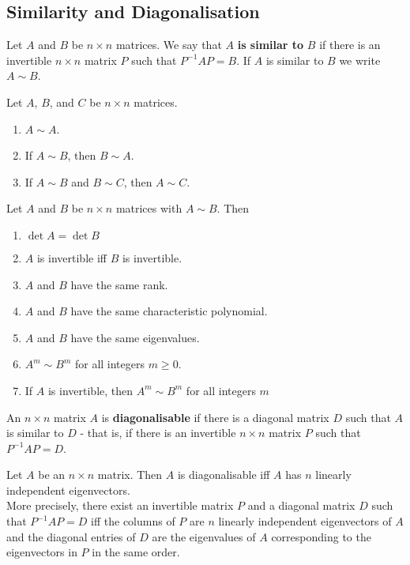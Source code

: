 \documentclass{article}
\begin{document}
\subsection{Similarity and Diagonalisation}
\begin{definition}
	Let $A$ and $B$ be $n\times n$ matrices. We say that $A$ \textbf{is similar to} $B$ if there is an invertible $n\times n$ matrix $P$ such that $P^{-1}AP=B$. If $A$ is similar to $B$ we write $A\sim B$.
\end{definition}
\begin{theorem}
	Let $A$, $B$, and $C$ be $n\times n$ matrices.
	\begin{enumerate}
		\item $A\sim A$.
		\item If $A\sim B$, then $B\sim A$.
		\item If $A\sim B$ and $B\sim C$, then $A\sim C$.
	\end{enumerate}
\end{theorem}
\begin{theorem}
	Let $A$ and $B$ be $n\times n$ matrices with $A\sim B$. Then
	\begin{enumerate}
		\item $\det A = \det B$
		\item $A$ is invertible iff $B$ is invertible.
		\item $A$ and $B$ have the same rank.
		\item $A$ and $B$ have the same characteristic polynomial.
		\item $A$ and $B$ have the same eigenvalues.
		\item $A^m\sim B^m$ for all integers $m\geq 0$.
		\item If $A$ is invertible, then $A^m\sim B^m$ for all integers $m$
	\end{enumerate}
\end{theorem}
\begin{definition}
	An $n\times n$ matrix $A$ is \textbf{diagonalisable} if there is a diagonal matrix $D$ such that $A$ is similar to $D$ - that is, if there is an invertible $n\times n$ matrix $P$ such that $P^{-1}AP = D$.
\end{definition}
\begin{theorem}
	Let $A$ be an $n\times n$ matrix. Then $A$ is diagonalisable iff $A$ has $n$ linearly independent eigenvectors.\\
	More precisely, there exist an invertible matrix $P$ and a diagonal matrix $D$ such that $P^{-1}AP=D$ iff the columns of $P$ are $n$ linearly independent eigenvectors of $A$ and the diagonal entries of $D$ are the eigenvalues of $A$ corresponding to the eigenvectors in $P$ in the same order.
\end{theorem}
\end{document}
